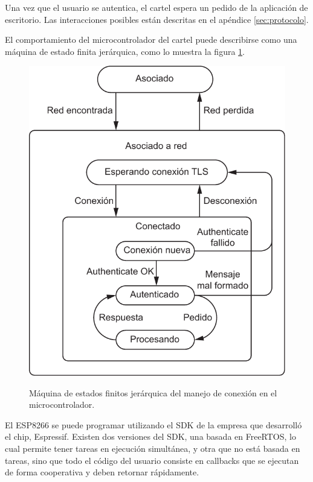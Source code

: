 Una vez que el usuario se autentica, el cartel espera un pedido de la aplicación de escritorio. Las interacciones posibles están descritas en el apéndice \ref{sec:protocolo}.

El comportamiento del microcontrolador del cartel puede describirse como una máquina de estado finita jerárquica, como lo muestra la figura \ref{fig:fsm-micro}.

\begin{figure}
	\centering
	\includegraphics[scale=0.8]{imagenes/fsm-micro.pdf}
	\label{fig:fsm-micro}
	\caption{Máquina de estados finitos jerárquica del manejo de conexión en el microcontrolador.}
\end{figure}

El ESP8266 se puede programar utilizando el SDK de la empresa que desarrolló el chip, Espressif. Existen dos versiones del SDK, una basada en FreeRTOS, lo cual permite tener tareas en ejecución simultánea, y otra que no está basada en tareas, sino que todo el código del usuario consiste en callbacks que se ejecutan de forma cooperativa y deben retornar rápidamente.

